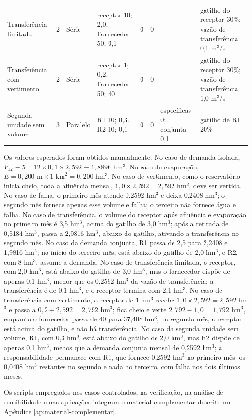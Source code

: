 \begin{table}[!htbp]
\begin{tabular}{>{\raggedright\arraybackslash}p{2.3cm}c>{\raggedright\arraybackslash}p{1.3cm}>{\raggedright\arraybackslash}p{2.0cm}cc>{\raggedright\arraybackslash}p{1.6cm}>{\raggedright\arraybackslash}p{2.9cm}}
        Transferência limitada & 2 & Série & receptor 10; 2,0. Fornecedor 50; 0,1 & 0 & 0 & 0 & gatilho do receptor 30\%; vazão de transferência 0,1 m$^3$/s \\
        Transferência com vertimento & 2 & Série & receptor 1; 0,2. Fornecedor 50; 40 & 0 & 0 & 0 & gatilho do receptor 30\%; vazão de transferência 1,0 m$^3$/s \\
        Segunda unidade sem volume & 3 & Paralelo & R1 10; 0,3. R2 10; 0,1 & 0 & 0 & específicas 0; conjunta 0,1 & gatilho de R1 20\% \\
        \bottomrule
    \end{tabular}
\end{table}

Os valores esperados foram obtidos manualmente. No caso de demanda isolada, $V_{12} = 5 - 12 \times 0{,}1 \times 2{,}592 = 1{,}8896$ hm$^3$. No caso de evaporação, $E = 0{,}200 \text{ m} \times 1 \text{ km}^2 = 0{,}200$ hm$^3$. No caso de vertimento, como o reservatório inicia cheio, toda a afluência mensal, $1{,}0 \times 2{,}592 = 2{,}592$ hm$^3$, deve ser vertida. No caso de falha, o primeiro mês atende 0,2592 hm$^3$ e deixa 0,2408 hm$^3$; o segundo mês fornece apenas esse volume e falha; o terceiro não fornece água e falha. No caso de transferência, o volume do receptor após afluência e evaporação no primeiro mês é 3,5 hm$^3$, acima do gatilho de 3,0 hm$^3$; após a retirada de 0,5184 hm$^3$, passa a 2,9816 hm$^3$, abaixo do gatilho, ativando a transferência no segundo mês. No caso da demanda conjunta, R1 passa de 2,5 para 2,2408 e 1,9816 hm$^3$; no início do terceiro mês, está abaixo do gatilho de 2,0 hm$^3$, e R2, com 8 hm$^3$, assume a demanda. No caso de transferência limitada, o receptor, com 2,0 hm$^3$, está abaixo do gatilho de 3,0 hm$^3$, mas o fornecedor dispõe de apenas 0,1 hm$^3$, menor que os 0,2592 hm$^3$ da vazão de transferência; a transferência é de 0,1 hm$^3$, e o receptor termina com 2,1 hm$^3$. No caso de transferência com vertimento, o receptor de 1 hm$^3$ recebe $1{,}0 \times 2{,}592 = 2{,}592$ hm$^3$ e passa a $0{,}2 + 2{,}592 = 2{,}792$ hm$^3$; fica cheio e verte $2{,}792 - 1{,}0 = 1{,}792$ hm$^3$, enquanto o fornecedor passa de 40 para 37,408 hm$^3$; no segundo mês, o receptor está acima do gatilho, e não há transferência. No caso da segunda unidade sem volume, R1, com 0,3 hm$^3$, está abaixo do gatilho de 2,0 hm$^3$, mas R2 dispõe de apenas 0,1 hm$^3$, menos que a demanda conjunta mensal de 0,2592 hm$^3$; a responsabilidade permanece com R1, que fornece 0,2592 hm$^3$ no primeiro mês, os 0,0408 hm$^3$ restantes no segundo e nada no terceiro, com falha nos dois últimos meses.

Os scripts empregados nos casos controlados, na verificação, na análise de sensibilidade e nas aplicações integram o material complementar descrito no Apêndice \ref{ap:material-complementar}.
